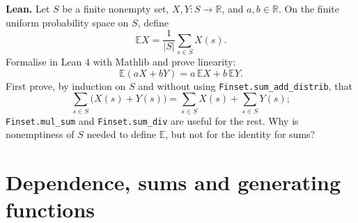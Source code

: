 \documentclass[11pt,a4paper]{article}
\newcommand{\Ebb}{\mathbb E}
\begin{document}
\noindent\textbf{Lean.} Let $S$ be a finite nonempty set, $X,Y:S\to\mathbb R$,
and $a,b\in\mathbb R$. On the finite uniform probability space on $S$, define
\[ \Ebb X=\frac1{|S|}\sum_{s\in S}X(s). \]
Formalise in Lean 4 with Mathlib and prove linearity:
\[ \Ebb(aX+bY)=a\,\Ebb X+b\,\Ebb Y. \]
First prove, by induction on $S$ and without using \texttt{Finset.sum\_add\_distrib}, that
\[ \sum_{s\in S}\bigl(X(s)+Y(s)\bigr)=\sum_{s\in S}X(s)+\sum_{s\in S}Y(s); \]
\texttt{Finset.mul\_sum} and \texttt{Finset.sum\_div} are useful for the rest.
Why is nonemptiness of $S$ needed to define $\Ebb$, but not for the identity for sums?

\section{Dependence, sums and generating functions}
\end{document}
